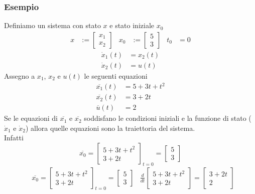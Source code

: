 \documentclass{article}
\begin{document}
\subsubsection{Esempio}
Definiamo un sistema con stato $x$ e stato iniziale $x_0$
\begin{align*}
    x &:=
    \begin{bmatrix}
        x_1\\
        x_2
    \end{bmatrix}
    &
    x_0 &:=
    \begin{bmatrix}
        5\\
        3
    \end{bmatrix}
    &
    t_0 &= 0
\end{align*}
\begin{align*}
    \dot x_1(t) &= x_2(t)\\
    \dot x_2(t) &= u(t)
\end{align*}
Assegno a $x_1$, $x_2$ e $u(t)$ le seguenti equazioni
\begin{align*}
    \overline{x_1}(t) &= 5+3t+t^2\\
    \overline{x_2}(t) &= 3+2t\\
    \overline{u}(t) &= 2
\end{align*}
Se le equazioni di $\overline{x_1}$ e $\overline{x_2}$ soddisfano le condizioni iniziali e la funzione di stato ($\dot x_1$ e $\dot x_2$) allora quelle equazioni sono la traiettoria del sistema.\\
Infatti
\[
    \overline{x_0} = 
    \begin{bmatrix}
        5+3t+t^2\\
        3+2t
    \end{bmatrix}_{t=0} 
    =
    \begin{bmatrix}
        5\\
        3
    \end{bmatrix}
\]
\begin{align*}
    &\overline{x_0} = 
    \begin{bmatrix}
        5+3t+t^2\\
        3+2t
    \end{bmatrix}_{t=0} 
    =
    \begin{bmatrix}
        5\\
        3
    \end{bmatrix}
    &
    \frac{d}{dt} 
    \begin{bmatrix}
        5+3t+t^2\\
        3+2t
    \end{bmatrix}
    =
    \begin{bmatrix}
        3+2t\\
        2
    \end{bmatrix}
\end{align*}
\end{document}

